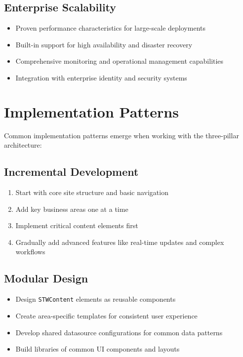 \subsection{Enterprise Scalability}

\begin{itemize}
    \item Proven performance characteristics for large-scale deployments
    \item Built-in support for high availability and disaster recovery
    \item Comprehensive monitoring and operational management capabilities
    \item Integration with enterprise identity and security systems
\end{itemize}

\section{Implementation Patterns}
\label{sec:implementation-patterns}

Common implementation patterns emerge when working with the three-pillar architecture:

\subsection{Incremental Development}

\begin{enumerate}
    \item Start with core site structure and basic navigation
    \item Add key business areas one at a time
    \item Implement critical content elements first
    \item Gradually add advanced features like real-time updates and complex workflows
\end{enumerate}

\subsection{Modular Design}

\begin{itemize}
    \item Design \texttt{STWContent} elements as reusable components
    \item Create area-specific templates for consistent user experience
    \item Develop shared datasource configurations for common data patterns
    \item Build libraries of common UI components and layouts
\end{itemize}


